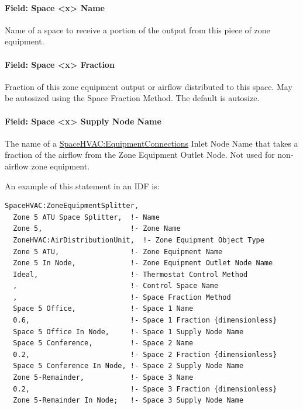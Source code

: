 \paragraph{Field: Space \textless{}x\textgreater{} Name}\label{field-seqsplitter-space-name}

Name of a space to receive a portion of the output from this piece of zone equipment.

\paragraph{Field: Space \textless{}x\textgreater{} Fraction}\label{field-seqsplitter-space-output-fraction}

Fraction of this zone equipment output or airflow distributed to this space. May be autosized using the Space Fraction Method. The default is autosize.

\paragraph{Field: Space \textless{}x\textgreater{} Supply Node Name}\label{field-seqsplitter-space-supply-node-name}

The name of a \hyperref[spacehvacequipmentconnections]{SpaceHVAC:EquipmentConnections} Inlet Node Name that takes a fraction of the airflow from the Zone Equipment Outlet Node.
Not used for non-airflow zone equipment.

An example of this statement in an IDF is:

\begin{lstlisting}
SpaceHVAC:ZoneEquipmentSplitter,
  Zone 5 ATU Space Splitter,  !- Name
  Zone 5,                     !- Zone Name
  ZoneHVAC:AirDistributionUnit,  !- Zone Equipment Object Type
  Zone 5 ATU,                 !- Zone Equipment Name
  Zone 5 In Node,             !- Zone Equipment Outlet Node Name
  Ideal,                      !- Thermostat Control Method
  ,                           !- Control Space Name
  ,                           !- Space Fraction Method
  Space 5 Office,             !- Space 1 Name
  0.6,                        !- Space 1 Fraction {dimensionless}
  Space 5 Office In Node,     !- Space 1 Supply Node Name
  Space 5 Conference,         !- Space 2 Name
  0.2,                        !- Space 2 Fraction {dimensionless}
  Space 5 Conference In Node, !- Space 2 Supply Node Name
  Zone 5-Remainder,           !- Space 3 Name
  0.2,                        !- Space 3 Fraction {dimensionless}
  Zone 5-Remainder In Node;   !- Space 3 Supply Node Name
\end{lstlisting}

